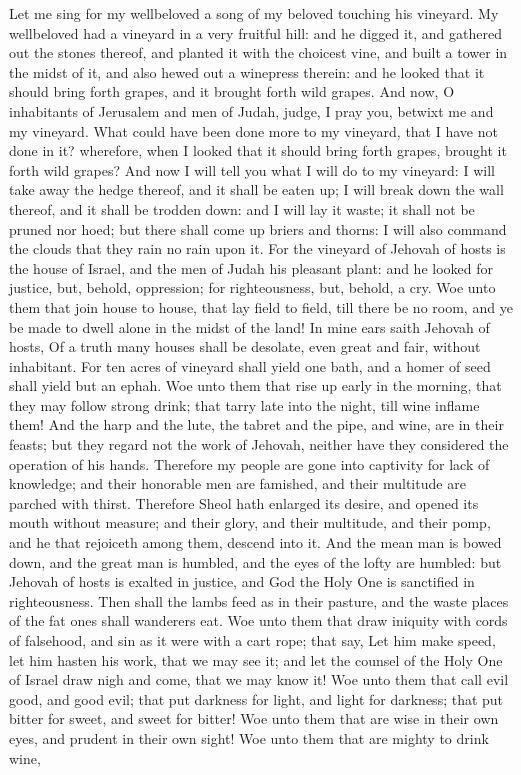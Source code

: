 Let me sing for my wellbeloved a song of my beloved touching his vineyard. My wellbeloved had a vineyard in a very fruitful hill: and he digged it, and gathered out the stones thereof, and planted it with the choicest vine, and built a tower in the midst of it, and also hewed out a winepress therein: and he looked that it should bring forth grapes, and it brought forth wild grapes.  And now, O inhabitants of Jerusalem and men of Judah, judge, I pray you, betwixt me and my vineyard. What could have been done more to my vineyard, that I have not done in it? wherefore, when I looked that it should bring forth grapes, brought it forth wild grapes? And now I will tell you what I will do to my vineyard: I will take away the hedge thereof, and it shall be eaten up; I will break down the wall thereof, and it shall be trodden down: and I will lay it waste; it shall not be pruned nor hoed; but there shall come up briers and thorns: I will also command the clouds that they rain no rain upon it. For the vineyard of Jehovah of hosts is the house of Israel, and the men of Judah his pleasant plant: and he looked for justice, but, behold, oppression; for righteousness, but, behold, a cry.  Woe unto them that join house to house, that lay field to field, till there be no room, and ye be made to dwell alone in the midst of the land! In mine ears saith Jehovah of hosts, Of a truth many houses shall be desolate, even great and fair, without inhabitant. For ten acres of vineyard shall yield one bath, and a homer of seed shall yield but an ephah. Woe unto them that rise up early in the morning, that they may follow strong drink; that tarry late into the night, till wine inflame them! And the harp and the lute, the tabret and the pipe, and wine, are in their feasts; but they regard not the work of Jehovah, neither have they considered the operation of his hands.  Therefore my people are gone into captivity for lack of knowledge; and their honorable men are famished, and their multitude are parched with thirst. Therefore Sheol hath enlarged its desire, and opened its mouth without measure; and their glory, and their multitude, and their pomp, and he that rejoiceth among them, descend into it. And the mean man is bowed down, and the great man is humbled, and the eyes of the lofty are humbled: but Jehovah of hosts is exalted in justice, and God the Holy One is sanctified in righteousness. Then shall the lambs feed as in their pasture, and the waste places of the fat ones shall wanderers eat.  Woe unto them that draw iniquity with cords of falsehood, and sin as it were with a cart rope; that say, Let him make speed, let him hasten his work, that we may see it; and let the counsel of the Holy One of Israel draw nigh and come, that we may know it! Woe unto them that call evil good, and good evil; that put darkness for light, and light for darkness; that put bitter for sweet, and sweet for bitter! Woe unto them that are wise in their own eyes, and prudent in their own sight! Woe unto them that are mighty to drink wine, 